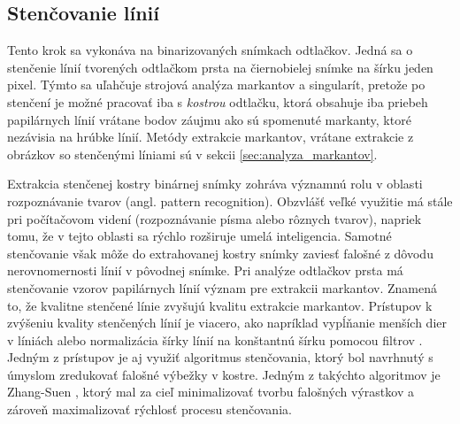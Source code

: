   \subsection{Stenčovanie línií}
  Tento krok sa vykonáva na binarizovaných snímkach odtlačkov. Jedná sa o stenčenie línií tvorených odtlačkom prsta na čiernobielej snímke na šírku
  jeden pixel. Týmto sa uľahčuje strojová analýza markantov a singularít, pretože po stenčení je možné pracovať iba s \emph{kostrou} odtlačku,
  ktorá obsahuje iba priebeh papilárnych línií vrátane bodov záujmu ako sú spomenuté markanty, ktoré nezávisia na hrúbke línií.
  Metódy extrakcie markantov, vrátane extrakcie z obrázkov so stenčenými líniami sú v sekcii \ref{sec:analyza_markantov}.
  
  Extrakcia stenčenej kostry binárnej snímky zohráva významnú rolu v oblasti rozpoznávanie tvarov (angl. pattern recognition). Obzvlášť veľké využitie má stále
  pri počítačovom videní (rozpoznávanie písma alebo rôznych tvarov), napriek tomu, že v tejto oblasti sa rýchlo rozširuje umelá inteligencia.
  Samotné stenčovanie však môže do extrahovanej kostry snímky zaviesť falošné  z dôvodu nerovnomernosti línií v pôvodnej snímke.
  Pri analýze odtlačkov prsta má stenčovanie vzorov papilárnych línií význam pre extrakcii markantov. Znamená to, že kvalitne stenčené línie zvyšujú kvalitu
  extrakcie markantov. Prístupov k zvýšeniu kvality stenčených línií je viacero, ako napríklad vypĺňanie menších dier v líniách alebo normalizácia šírky
  línií na konštantnú šírku pomocou filtrov \cite{Handbook}. Jedným z prístupov je aj využiť algoritmus stenčovania, ktorý bol navrhnutý s úmyslom zredukovať
  falošné výbežky v kostre. Jedným z takýchto algoritmov je Zhang-Suen \cite{ZhangSuen_thinning}, ktorý mal za cieľ minimalizovať tvorbu falošných výrastkov
  a zároveň maximalizovať rýchlosť procesu stenčovania.
  
